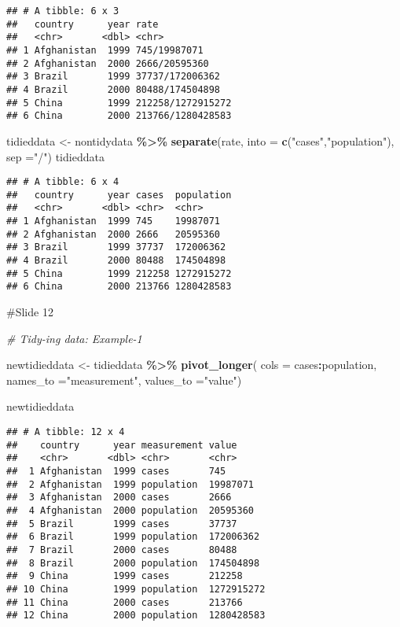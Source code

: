 \documentclass[
]{article}
\newenvironment{Shaded}{\begin{snugshade}}{\end{snugshade}}
\newcommand{\AttributeTok}[1]{\textcolor[rgb]{0.13,0.29,0.53}{#1}}
\newcommand{\CommentTok}[1]{\textcolor[rgb]{0.56,0.35,0.01}{\textit{#1}}}
\newcommand{\FunctionTok}[1]{\textcolor[rgb]{0.13,0.29,0.53}{\textbf{#1}}}
\newcommand{\NormalTok}[1]{#1}
\newcommand{\OtherTok}[1]{\textcolor[rgb]{0.56,0.35,0.01}{#1}}
\newcommand{\SpecialCharTok}[1]{\textcolor[rgb]{0.81,0.36,0.00}{\textbf{#1}}}
\newcommand{\StringTok}[1]{\textcolor[rgb]{0.31,0.60,0.02}{#1}}
\begin{document}
\begin{verbatim}
## # A tibble: 6 x 3
##   country      year rate             
##   <chr>       <dbl> <chr>            
## 1 Afghanistan  1999 745/19987071     
## 2 Afghanistan  2000 2666/20595360    
## 3 Brazil       1999 37737/172006362  
## 4 Brazil       2000 80488/174504898  
## 5 China        1999 212258/1272915272
## 6 China        2000 213766/1280428583
\end{verbatim}

\begin{Shaded}
\begin{Highlighting}[]
\NormalTok{tidieddata }\OtherTok{\textless{}{-}}\NormalTok{ nontidydata }\SpecialCharTok{\%\textgreater{}\%}
  \FunctionTok{separate}\NormalTok{(rate, }\AttributeTok{into =} \FunctionTok{c}\NormalTok{(}\StringTok{"cases"}\NormalTok{,}\StringTok{"population"}\NormalTok{),}
           \AttributeTok{sep =}\StringTok{"/"}\NormalTok{)}
\NormalTok{tidieddata}
\end{Highlighting}
\end{Shaded}

\begin{verbatim}
## # A tibble: 6 x 4
##   country      year cases  population
##   <chr>       <dbl> <chr>  <chr>     
## 1 Afghanistan  1999 745    19987071  
## 2 Afghanistan  2000 2666   20595360  
## 3 Brazil       1999 37737  172006362 
## 4 Brazil       2000 80488  174504898 
## 5 China        1999 212258 1272915272
## 6 China        2000 213766 1280428583
\end{verbatim}

\#Slide 12

\begin{Shaded}
\begin{Highlighting}[]
\CommentTok{\# Tidy{-}ing data: Example{-}1}

\NormalTok{newtidieddata }\OtherTok{\textless{}{-}}\NormalTok{ tidieddata }\SpecialCharTok{\%\textgreater{}\%}
  \FunctionTok{pivot\_longer}\NormalTok{(}
    \AttributeTok{cols =}\NormalTok{ cases}\SpecialCharTok{:}\NormalTok{population,}
    \AttributeTok{names\_to =}\StringTok{"measurement"}\NormalTok{,}
    \AttributeTok{values\_to =}\StringTok{"value"}\NormalTok{)}

\NormalTok{newtidieddata}
\end{Highlighting}
\end{Shaded}

\begin{verbatim}
## # A tibble: 12 x 4
##    country      year measurement value     
##    <chr>       <dbl> <chr>       <chr>     
##  1 Afghanistan  1999 cases       745       
##  2 Afghanistan  1999 population  19987071  
##  3 Afghanistan  2000 cases       2666      
##  4 Afghanistan  2000 population  20595360  
##  5 Brazil       1999 cases       37737     
##  6 Brazil       1999 population  172006362 
##  7 Brazil       2000 cases       80488     
##  8 Brazil       2000 population  174504898 
##  9 China        1999 cases       212258    
## 10 China        1999 population  1272915272
## 11 China        2000 cases       213766    
## 12 China        2000 population  1280428583
\end{verbatim}
\end{document}
